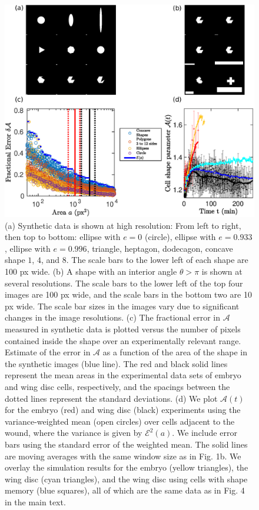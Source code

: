 \documentclass[%
 reprint,
superscriptaddress,
 amsmath,amssymb,
pre,
]{revtex4-2}
\begin{document}
\begin{figure}
    \centering
    \includegraphics[width=\linewidth]{suppFigures/SuppFigCalAErrors.eps}
\caption{(a) Synthetic data is shown at high resolution: From left to right, then top to bottom: ellipse with $e=0$ (circle), ellipse with $e=0.933$, ellipse with $e=0.996$, triangle, heptagon, dodecagon, concave shape $1$, $4$, and $8$. The scale bars to the lower left of each shape are 100 px wide. (b) A shape with an interior angle $\theta > \pi$ is shown at several resolutions. The scale bars to the lower left of the top four images are 100 px wide, and the scale bars in the bottom two are 10 px wide. The scale bar sizes in the images vary due to significant changes in the image resolutions. (c) The fractional error in $\mathcal{A}$ measured in synthetic data is plotted versus the number of pixels contained inside the shape over an experimentally relevant range. Estimate of the error in $\mathcal{A}$ as a function of the area of the shape in the synthetic images (blue line). The red and black solid lines represent the mean areas in the experimental data sets of embryo and wing disc cells, respectively, and the spacings between the dotted lines represent the standard deviations. (d) We plot $\mathcal{A}(t)$ for the embryo (red) and wing disc (black) experiments using the variance-weighted mean (open circles) over cells adjacent to the wound, where the variance is given by $\mathcal{E}^2(a)$. We include error bars using the standard error of the weighted mean. The solid lines are moving averages with the same window size as in Fig. 1b. We overlay the simulation results for the embryo (yellow triangles), the wing disc (cyan triangles), and the wing disc using cells with shape memory (blue squares), all of which are the same data as in Fig. 4 in the main text.
}
\label{suppfig:imagAnalysisErrors}
\end{figure}
\end{document}
